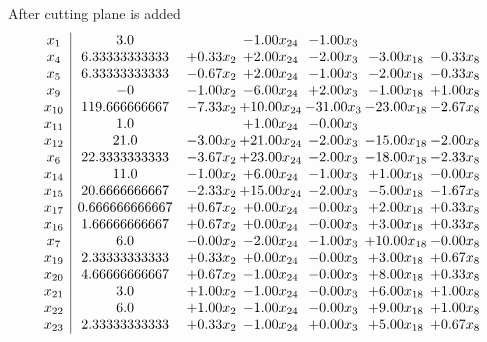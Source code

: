 \documentclass[8pt]{article}
\begin{document}
 After cutting plane is added 
\[\begin{array}{c| c c@{\hskip 2pt} c@{\hskip 2pt} c@{\hskip 2pt} c@{\hskip 2pt} c@{\hskip 2pt} }
 x_{1}   &  3.0  &   & -1.00 x_{24} & -1.00 x_{3} &    &   \\
 x_{4}   &  6.33333333333 & +  0.33 x_{2} & +  2.00 x_{24} & -2.00 x_{3} & -3.00 x_{18} & -0.33 x_{8}\\
 x_{5}   &  6.33333333333 & -0.67 x_{2} & +  2.00 x_{24} & -1.00 x_{3} & -2.00 x_{18} & -0.33 x_{8}\\
 x_{9}   &  -0 & -1.00 x_{2} & -6.00 x_{24} & +  2.00 x_{3} & -1.00 x_{18} & +  1.00 x_{8}\\
 x_{10}   &  119.666666667 & -7.33 x_{2} & + 10.00 x_{24} & -31.00 x_{3} & -23.00 x_{18} & -2.67 x_{8}\\
 x_{11}   &  1.0  &   & +  1.00 x_{24} & -0.00 x_{3} &    &   \\
 x_{12}   &  21.0 & -3.00 x_{2} & + 21.00 x_{24} & -2.00 x_{3} & -15.00 x_{18} & -2.00 x_{8}\\
 x_{6}   &  22.3333333333 & -3.67 x_{2} & + 23.00 x_{24} & -2.00 x_{3} & -18.00 x_{18} & -2.33 x_{8}\\
 x_{14}   &  11.0 & -1.00 x_{2} & +  6.00 x_{24} & -1.00 x_{3} & +  1.00 x_{18} & -0.00 x_{8}\\
 x_{15}   &  20.6666666667 & -2.33 x_{2} & + 15.00 x_{24} & -2.00 x_{3} & -5.00 x_{18} & -1.67 x_{8}\\
 x_{17}   &  0.666666666667 & +  0.67 x_{2} & +  0.00 x_{24} & -0.00 x_{3} & +  2.00 x_{18} & +  0.33 x_{8}\\
 x_{16}   &  1.66666666667 & +  0.67 x_{2} & +  0.00 x_{24} & -0.00 x_{3} & +  3.00 x_{18} & +  0.33 x_{8}\\
 x_{7}   &  6.0 & -0.00 x_{2} & -2.00 x_{24} & -1.00 x_{3} & + 10.00 x_{18} & -0.00 x_{8}\\
 x_{19}   &  2.33333333333 & +  0.33 x_{2} & +  0.00 x_{24} & -0.00 x_{3} & +  3.00 x_{18} & +  0.67 x_{8}\\
 x_{20}   &  4.66666666667 & +  0.67 x_{2} & -1.00 x_{24} & -0.00 x_{3} & +  8.00 x_{18} & +  0.33 x_{8}\\
 x_{21}   &  3.0 & +  1.00 x_{2} & -1.00 x_{24} & -0.00 x_{3} & +  6.00 x_{18} & +  1.00 x_{8}\\
 x_{22}   &  6.0 & +  1.00 x_{2} & -1.00 x_{24} & -0.00 x_{3} & +  9.00 x_{18} & +  1.00 x_{8}\\
 x_{23}   &  2.33333333333 & +  0.33 x_{2} & -1.00 x_{24} & +  0.00 x_{3} & +  5.00 x_{18} & +  0.67 x_{8}\\

\end{array}\]
\end{document}
